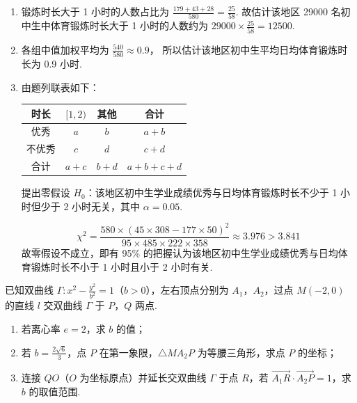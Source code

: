 \begin{solution}
\begin{enumerate}
\item 锻炼时长大于 1 小时的人数占比为
\(\frac{179+43+28}{580}=\frac{25}{58}\).
故估计该地区 29000 名初中生中体育锻炼时长大于 1 小时的人数约为
\(29000\times \frac{25}{58}=12500\).

\item 各组中值加权平均为
\(\frac{540}{580}\approx 0.9\)，
所以估计该地区初中生平均日均体育锻炼时长为 0.9 小时.

\item 由题列联表如下：

\begin{tabular}{|c|c|c|c|}
\hline
时长 & \([1,2)\) & 其他 & 合计 \\
\hline
优秀 & \(a\) & \(b\) & \(a+b\) \\
\hline
不优秀 & \(c\) & \(d\) & \(c+d\) \\
\hline
合计 & \(a+c\) & \(b+d\) & \(a+b+c+d\) \\
\hline
\end{tabular}

提出零假设 \(H_0\)：该地区初中生学业成绩优秀与日均体育锻炼时长不少于 1 小时但少于 2 小时无关，其中 \(\alpha=0.05\).

\[
\chi^2=\frac{580\times (45\times 308-177\times 50)^2}{95\times 485\times 222\times 358}\approx 3.976>3.841
\]
故零假设不成立，即有 95\% 的把握认为该地区初中生学业成绩优秀与日均体育锻炼时长不小于 1 小时且小于 2 小时有关.
\end{enumerate}
\end{solution}

\begin{problem}
已知双曲线 \(\Gamma:x^2-\frac{y^2}{b^2}=1\)（\(b>0\)），左右顶点分别为 \(A_1\)，\(A_2\)，过点 \(M(-2,0)\) 的直线 \(l\) 交双曲线 \(\Gamma\) 于 \(P\)，\(Q\) 两点.

\begin{enumerate}
\item 若离心率 \(e=2\)，求 \(b\) 的值；
\item 若 \(b=\frac{2\sqrt{6}}{3}\)，点 \(P\) 在第一象限，\(\triangle MA_2P\) 为等腰三角形，求点 \(P\) 的坐标；
\item 连接 \(QO\)（\(O\) 为坐标原点）并延长交双曲线 \(\Gamma\) 于点 \(R\)，若 \(\overrightarrow{A_1R}\cdot\overrightarrow{A_2P}=1\)，求 \(b\) 的取值范围.
\end{enumerate}
\end{problem}

